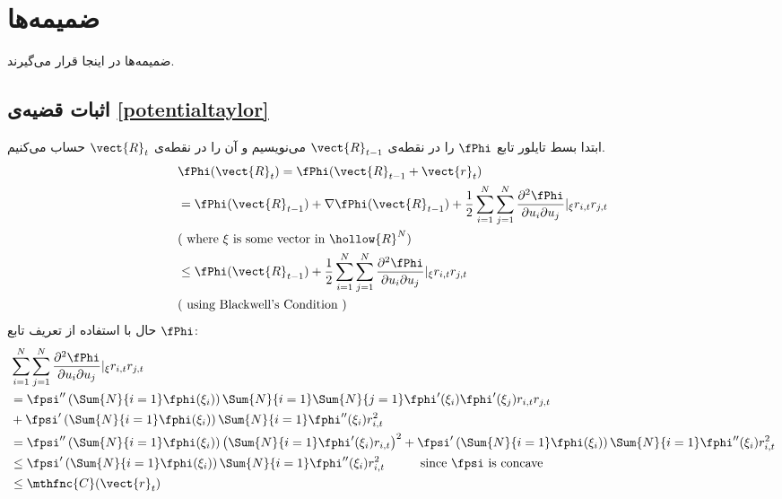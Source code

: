 

\section{
ضمیمه‌ها
}

ضمیمه‌ها در اینجا قرار می‌گیرند.

\subsection{
اثبات قضیه‌ی 
\ref{potentialtaylor}
}
ابتدا بسط تایلور تابع 
$\fPhi$ 
را در نقطه‌ی 
$\vect{R}_{t-1}$ 
می‌نویسیم و آن را در نقطه‌ی 
$\vect{R}_{t}$ 
حساب می‌کنیم.
\[
\begin{split}
&\fPhi( \vect{R}_{t} ) = \fPhi( \vect{R}_{t-1} + \vect{r}_t )\\
&= \fPhi( \vect{R}_{t-1} ) + \nabla \fPhi( \vect{R}_{t-1} ) + \frac{1}{2} \sum^{N}_{i=1} \sum^{N}_{j=1} \frac{ \partial^2 \fPhi }{ \partial u_i \partial u_j } \vert_{\xi} r_{i,t} r_{j,t}\\
& ( \mbox{ where } \xi \mbox{ is some vector in } \hollow{R}^N )\\
&\leq \fPhi( \vect{R}_{t-1} ) + \frac{1}{2} \sum^{N}_{i=1} \sum^{N}_{j=1} \frac{ \partial^2 \fPhi }{ \partial u_i \partial u_j } \vert_{\xi} r_{i,t} r_{j,t}\\
& ( \mbox{ using Blackwell's Condition } )
\end{split}
\]
حال با استفاده از تعریف تابع 
$\fPhi$:
\[
\begin{split}
&\sum^{N}_{i=1} \sum^{N}_{j=1} \frac{\partial^2 \fPhi}{\partial u_i \partial u_j}\vert_{\xi} r_{i,t} r_{j,t}\\
&= \fpsi^{\prime\prime} \left( \Sum{N}{i=1} \fphi(\xi_i) \right) \Sum{N}{i=1} \Sum{N}{j=1} \fphi^\prime (\xi_i) \fphi^\prime (\xi_j) r_{i,t} r_{j,t}\\
& + \fpsi^\prime \left( \Sum{N}{i=1} \fphi(\xi_i) \right) \Sum{N}{i=1} \fphi^{\prime\prime} (\xi_i) r^{2}_{i,t}\\
&= \fpsi^{\prime\prime} \left( \Sum{N}{i=1} \fphi(\xi_i) \right) \left( \Sum{N}{i=1} \fphi^{\prime} (\xi_i) r_{i,t} \right)^2 + \fpsi^\prime \left( \Sum{N}{i=1} \fphi( \xi_i ) \right) \Sum{N}{i=1} \fphi^{\prime\prime} (\xi_i) r^{2}_{i,t}\\
& \leq \fpsi^\prime \left( \Sum{N}{i=1} \fphi( \xi_i ) \right) \Sum{N}{i=1} \fphi^{\prime\prime} (\xi_i) r^{2}_{i,t} \hspace{1cm} \mbox{since } \fpsi \mbox{ is concave}\\
& \leq \mthfnc{C} (\vect{r}_t)
\end{split}
\]
